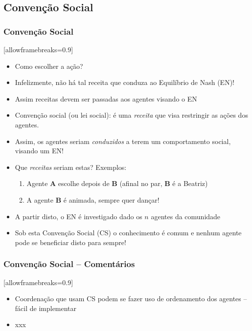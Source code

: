 \subsection{Convenção Social}

\begin{frame}
\frametitle{Convenção Social}[allowframebreaks=0.9]

\begin{itemize}
  \item Como escolher a ação?
  \item Infelizmente, não há tal receita que conduza ao Equilíbrio de Nash (EN)!
  \item Assim receitas devem ser passadas aos agentes visando o EN

\pause
  \item Convenção social (ou lei social): é uma \textit{receita} que visa
  restringir as ações  dos agentes.
  
  \item Assim, os agentes seriam \textit{conduzidos} a terem um comportamento
  social, visando um EN!
  
  \item Que \textit{receitas} seriam estas? Exemplos:
  \pause
  \begin{enumerate}
    \item Agente \textbf{A} escolhe depois de \textbf{B} (afinal no par, \textbf{B} é a Beatriz)
    \item A agente \textbf{B} é animada, sempre quer dançar!
  \end{enumerate}
  
\item A partir disto, o EN é investigado dado os $n$ agentes da comunidade


  \item Sob esta Convenção Social (CS) o conhecimento é comum e nenhum agente pode se
  beneficiar disto para sempre!
 
\end{itemize}


\end{frame}


\begin{frame}
\frametitle{Convenção Social -- Comentários}[allowframebreaks=0.9]

\begin{itemize}
  \item Coordenação que usam CS podem se fazer uso de ordenamento dos agentes -- fácil de implementar
  
  \item xxx
  
  
\end{itemize}



\end{frame}



